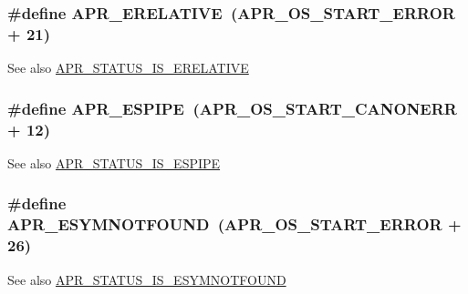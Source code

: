 \subsubsection[{\texorpdfstring{A\+P\+R\+\_\+\+E\+R\+E\+L\+A\+T\+I\+VE}{APR_ERELATIVE}}]{\setlength{\rightskip}{0pt plus 5cm}\#define A\+P\+R\+\_\+\+E\+R\+E\+L\+A\+T\+I\+VE~({\bf A\+P\+R\+\_\+\+O\+S\+\_\+\+S\+T\+A\+R\+T\+\_\+\+E\+R\+R\+OR} + 21)}\hypertarget{group__APR__Error_gae4688dfa866265b9ec3623689c23923b}{}\label{group__APR__Error_gae4688dfa866265b9ec3623689c23923b}
\begin{DoxySeeAlso}{See also}
\hyperlink{group__APR__STATUS__IS_ga7a8fca5102890e9a0bc4133ba848d52c}{A\+P\+R\+\_\+\+S\+T\+A\+T\+U\+S\+\_\+\+I\+S\+\_\+\+E\+R\+E\+L\+A\+T\+I\+VE} 
\end{DoxySeeAlso}
\subsubsection[{\texorpdfstring{A\+P\+R\+\_\+\+E\+S\+P\+I\+PE}{APR_ESPIPE}}]{\setlength{\rightskip}{0pt plus 5cm}\#define A\+P\+R\+\_\+\+E\+S\+P\+I\+PE~({\bf A\+P\+R\+\_\+\+O\+S\+\_\+\+S\+T\+A\+R\+T\+\_\+\+C\+A\+N\+O\+N\+E\+RR} + 12)}\hypertarget{group__APR__Error_ga3be81035cd2da76fbc27c75496489359}{}\label{group__APR__Error_ga3be81035cd2da76fbc27c75496489359}
\begin{DoxySeeAlso}{See also}
\hyperlink{group__APR__STATUS__IS_gac9b1e593377ac3b93b259f30f04a1185}{A\+P\+R\+\_\+\+S\+T\+A\+T\+U\+S\+\_\+\+I\+S\+\_\+\+E\+S\+P\+I\+PE} 
\end{DoxySeeAlso}
\subsubsection[{\texorpdfstring{A\+P\+R\+\_\+\+E\+S\+Y\+M\+N\+O\+T\+F\+O\+U\+ND}{APR_ESYMNOTFOUND}}]{\setlength{\rightskip}{0pt plus 5cm}\#define A\+P\+R\+\_\+\+E\+S\+Y\+M\+N\+O\+T\+F\+O\+U\+ND~({\bf A\+P\+R\+\_\+\+O\+S\+\_\+\+S\+T\+A\+R\+T\+\_\+\+E\+R\+R\+OR} + 26)}\hypertarget{group__APR__Error_ga8d96410fc32408160e1e85e2e96402fa}{}\label{group__APR__Error_ga8d96410fc32408160e1e85e2e96402fa}
\begin{DoxySeeAlso}{See also}
\hyperlink{group__APR__STATUS__IS_gafab6c5fe2f9b906d533d253097a16e09}{A\+P\+R\+\_\+\+S\+T\+A\+T\+U\+S\+\_\+\+I\+S\+\_\+\+E\+S\+Y\+M\+N\+O\+T\+F\+O\+U\+ND} 
\end{DoxySeeAlso}
